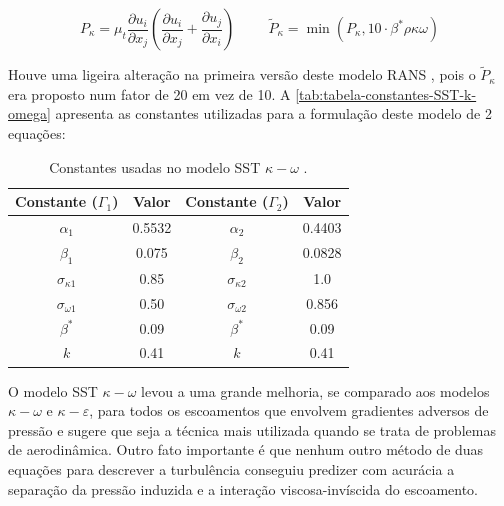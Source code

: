 \begin{equation}
	\label{eq:producao-tilde-k-modelo-sst-k-omega}
	P_{\kappa} = \mu_{t}\frac{\partial u_i}{\partial x_j}\left(\frac{\partial u_i}{\partial x_j} + \frac{\partial u_j}{\partial x_i}\right)
	\hspace{1cm}
	\tilde{P}_{\kappa} = \min(P_\kappa, 10\cdot\beta^{*}\rho\kappa\omega)
\end{equation}

Houve uma ligeira alteração na primeira versão deste modelo RANS \cite{Menter1994TwoequationET}, pois o \(\tilde{P}_{\kappa}\) era proposto num fator de \num{20} em vez de \num{10}. A \autoref{tab:tabela-constantes-SST-k-omega} apresenta as constantes utilizadas para a formulação deste modelo de 2 equações:

\begin{table}[ht]
\centering
\caption[Constantes usadas no modelo SST \(\kappa-\omega\).]{Constantes usadas no modelo SST \(\kappa-\omega\) \cite{Menter1994TwoequationET,Menter2003,Menter2009}.}
\vspace{0.5cm}
\begin{tabular}{c|c|c|c}
 
Constante (\(\Gamma_1\)) 	& Valor  		 & Constante (\(\Gamma_2\)) & Valor \\
\hline
\(\alpha_1\) 				& \num{0,5532} 	 & \(\alpha_2\) 			& \num{0,4403} \\
\(\beta_1\) 				& \num{0,075}  	 & \(\beta_2\) 				& \num{0,0828} \\
\(\sigma_{\kappa 1}\) 		& \num{0,85}	 & \(\sigma_{\kappa 2}\) 	& \num{1,0} \\
\(\sigma_{\omega 1}\) 		& \num{0,50} 	 & \(\sigma_{\omega 2}\) 	& \num{0,856} \\
\(\beta^{*}\) 				& \num{0,09} 	 & \(\beta^{*}\) 			& \num{0,09} \\
\(k\) 						& \num{0,41} 	 & \(k\) 					& \num{0,41}

\end{tabular}
\label{tab:tabela-constantes-SST-k-omega}
\end{table}

O modelo SST \(\kappa-\omega\) levou a uma grande melhoria, se comparado aos modelos \(\kappa-\omega\) e \(\kappa-\varepsilon\), para todos os escoamentos que envolvem gradientes adversos de pressão e \citeauthor{Menter1994TwoequationET} sugere que seja a técnica mais utilizada quando se trata de problemas de aerodinâmica. Outro fato importante é que nenhum outro método de duas equações para descrever a turbulência conseguiu predizer com acurácia a separação da pressão induzida e a interação viscosa-invíscida do escoamento.